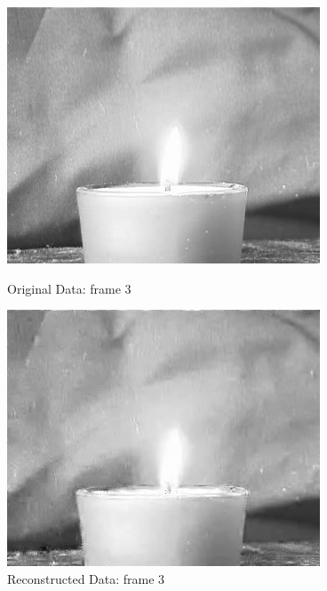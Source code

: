 \documentclass[12pt]{article}
\begin{document}
\begin{itemize}
\begin{enumerate}
    \begin{figure}[H]
        \centering
        \begin{minipage}{.45\textwidth}
            \centering
            \includegraphics[width=\linewidth]{results/flame_5_orig_3.png}
            \caption*{Original Data: frame 3}
        \end{minipage}
        \begin{minipage}{.45\textwidth}
            \centering
            \includegraphics[width=\linewidth]{results/flame_5_recon_3.png}
            \caption*{Reconstructed Data: frame 3}
        \end{minipage}
    \end{figure}


\end{enumerate}
\end{itemize}
\end{document}
